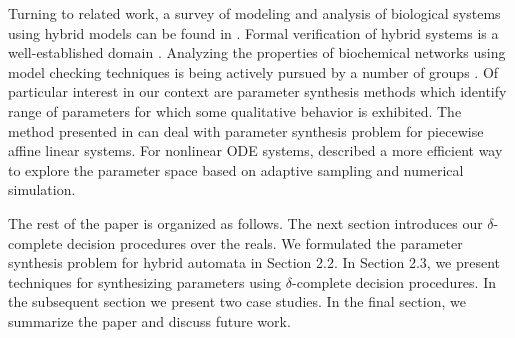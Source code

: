 
Turning to related work, a survey of modeling and analysis of biological systems using hybrid models can be found in \cite{bud}. Formal verification of hybrid systems is a well-established domain \citep{alur}. Analyzing the properties of biochemical networks using model checking techniques \citep{clarkebook} is being actively pursued by a number of groups \citep{clarke08,chabrier04,kwiatkowska08,miyano11}. Of particular interest in our context are parameter synthesis methods which identify range of parameters for which some qualitative behavior is exhibited. The method presented in \cite{rovergene} can deal with parameter synthesis problem for piecewise affine linear systems. For nonlinear ODE systems, \cite{donze} described a more efficient way to explore the parameter space based on adaptive sampling and numerical simulation.







The rest of the paper is organized as follows. The next section introduces our $\delta$-complete decision procedures over the reals. We formulated the parameter synthesis problem for hybrid automata in Section 2.2. In Section 2.3, we present techniques for synthesizing parameters using $\delta$-complete decision procedures. In the subsequent section we present two case studies. In the final section, we summarize the paper and discuss future work.
